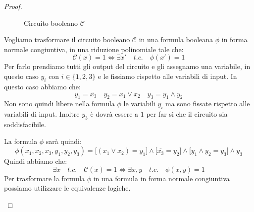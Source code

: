 \begin{proof}
\begin{enumerate}
\begin{figure}[H]
                \caption{Circuito booleano $\mathcal{C}$}
            \end{figure}
            Vogliamo trasformare il circuito booleano $\mathcal{C}$ in una
            formula booleana $\phi$ in forma normale congiuntiva, in una 
            riduzione polinomiale tale che:
            \[
                \mathcal{C}(x) = 1 \iff \exists x' \quad t.c. \quad \phi(x') = 1
            \]
            Per farlo prendiamo tutti gli output del circuito e gli assegnamo 
            una variabile, in questo caso $y_i$ con $i \in \{1, 2, 3\}$ e le fissiamo 
            rispetto alle variabili di input. In questo caso abbiamo che:
            \[
                y_1 = \overline{x_3} \quad y_2 = x_1 \lor x_2 \quad y_3 = y_1 \land y_2
            \]
            Non sono quindi libere nella formula $\phi$ le variabili $y_i$ ma 
            sono fissate rispetto alle variabili di input. Inoltre $y_3$ è dovrà 
            essere a $1$ per far si che il circuito sia soddisfacibile.

            La formula $\phi$ sarà quindi:
            \[
                \phi(x_1, x_2, x_3, y_1, y_2, y_3) 
                = \big[ (x_1 \lor x_2) = y_1 \big] \land 
                \big[ \overline{x_3} = y_2 \big] \land 
                \big[ y_1 \land y_2 = y_3 \big] \land
                y_3
            \]
            Quindi abbiamo che:
            \[
                \exists x \quad t.c. \quad \mathcal{C}(x) = 1
                \iff \exists x,y \quad t.c. \quad \phi(x, y) = 1
            \]
            Per trasformare la formula $\phi$ in una formula in forma normale
            congiuntiva possiamo utilizzare le equivalenze logiche.


\end{enumerate}
\end{proof}

